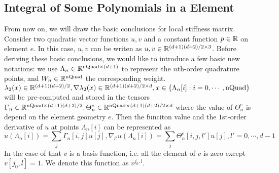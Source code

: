 \subsection{Integral of Some Polynomials in a Element}
From now on, we will draw the basic conclusions for local stiffness matrix. 
Consider two quadratic vector functions $u,v$ and a constant function $p\in\mathbb{R}$ on element $e$.
In this case, $u,v$ can be writen as $u,v\in\mathbb{R}^{(d+1)(d+2)/2\times3}$.
Before deriving these basic conclusions, we would like to introduce a few basic new notations:
we use $\Lambda_n\in\mathbb{R}^{\text{nQuad}\times (d+1)}$ to represent the $n$th-order quadrature points, 
and $W_n\in\mathbb{R}^{\text{nQuad}}$ the corresponding weight.
$\lambda_2(x)\in\mathbb{R}^{(d+1)(d+2)/2},
\nabla \lambda_2(x)\in\mathbb{R}^{(d+1)(d+2)/2\times d},
x\in\{\Lambda_n[i]:i=0,\cdots,\text{nQuad}\}$ 
will be pre-computed and stored in the tensors 
$\Gamma_n\in\mathbb{R}^{\text{nQuad}\times(d+1)(d+2)/2},
\Theta_n^e\in\mathbb{R}^{\text{nQuad}\times(d+1)(d+2)/2\times d}$
where the value of $\Theta^e_n$ is depend on the element geometry $e$.
Then the funciton value and the $1$st-order derivative of $u$ at points $\Lambda_n[i]$ can be represented as
\[u(\Lambda_n[i])=\sum_j \Gamma_n[i,j]u[j],
\nabla_{l'} u(\Lambda_n[i])=\sum_j \Theta_n^e[i,j,l']u[j],l'=0,\cdots,d-1\]
In the case of that $v$ is a basis function, i.e. all the element of 
$v$ is zero except $v[j_0,l]=1$.
We denote this function as $v^{j_0,l}$.
